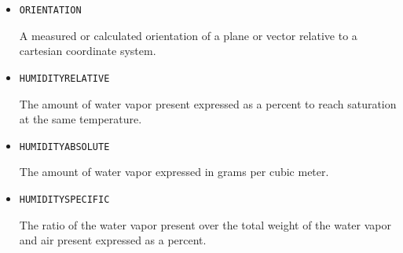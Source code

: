 \begin{itemize}
\item \texttt{ORIENTATION}  

A measured or calculated orientation of a plane or vector relative to a cartesian coordinate system.


\item \texttt{HUMIDITY\textunderscore RELATIVE}  

The amount of water vapor present expressed as a percent to reach saturation at the same temperature.


\item \texttt{HUMIDITY\textunderscore ABSOLUTE}  

The amount of water vapor expressed in grams per cubic meter.


\item \texttt{HUMIDITY\textunderscore SPECIFIC}  

The ratio of the water vapor present over the total weight of the water vapor and air present expressed as a percent.

\end{itemize}

